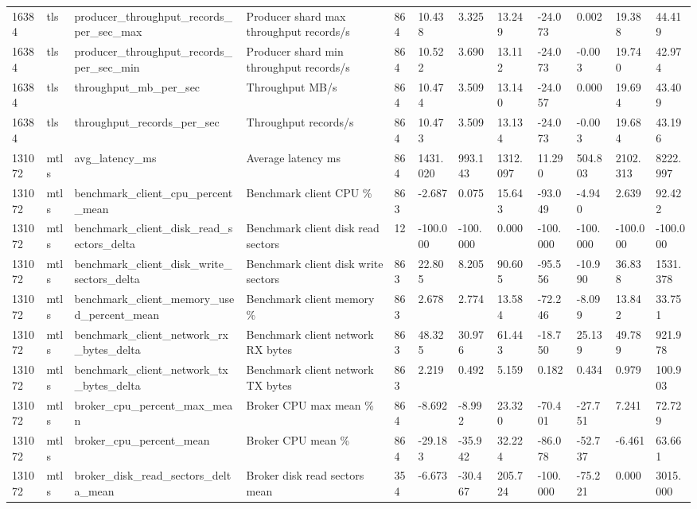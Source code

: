 \begin{longtable}{llllllllllll}
16384 & tls & producer\_throughput\_records\_per\_sec\_max & Producer shard max throughput records/s & 864 & 10.438 & 3.325 & 13.249 & -24.073 & 0.002 & 19.388 & 44.419 \\
16384 & tls & producer\_throughput\_records\_per\_sec\_min & Producer shard min throughput records/s & 864 & 10.522 & 3.690 & 13.112 & -24.073 & -0.003 & 19.740 & 42.974 \\
16384 & tls & throughput\_mb\_per\_sec & Throughput MB/s & 864 & 10.474 & 3.509 & 13.140 & -24.057 & 0.000 & 19.694 & 43.409 \\
16384 & tls & throughput\_records\_per\_sec & Throughput records/s & 864 & 10.473 & 3.509 & 13.134 & -24.073 & -0.003 & 19.684 & 43.196 \\
131072 & mtls & avg\_latency\_ms & Average latency ms & 864 & 1431.020 & 993.143 & 1312.097 & 11.290 & 504.803 & 2102.313 & 8222.997 \\
131072 & mtls & benchmark\_client\_cpu\_percent\_mean & Benchmark client CPU \% & 863 & -2.687 & 0.075 & 15.643 & -93.049 & -4.940 & 2.639 & 92.422 \\
131072 & mtls & benchmark\_client\_disk\_read\_sectors\_delta & Benchmark client disk read sectors & 12 & -100.000 & -100.000 & 0.000 & -100.000 & -100.000 & -100.000 & -100.000 \\
131072 & mtls & benchmark\_client\_disk\_write\_sectors\_delta & Benchmark client disk write sectors & 863 & 22.805 & 8.205 & 90.605 & -95.556 & -10.990 & 36.838 & 1531.378 \\
131072 & mtls & benchmark\_client\_memory\_used\_percent\_mean & Benchmark client memory \% & 863 & 2.678 & 2.774 & 13.584 & -72.246 & -8.099 & 13.842 & 33.751 \\
131072 & mtls & benchmark\_client\_network\_rx\_bytes\_delta & Benchmark client network RX bytes & 863 & 48.325 & 30.976 & 61.443 & -18.750 & 25.139 & 49.789 & 921.978 \\
131072 & mtls & benchmark\_client\_network\_tx\_bytes\_delta & Benchmark client network TX bytes & 863 & 2.219 & 0.492 & 5.159 & 0.182 & 0.434 & 0.979 & 100.903 \\
131072 & mtls & broker\_cpu\_percent\_max\_mean & Broker CPU max mean \% & 864 & -8.692 & -8.992 & 23.320 & -70.401 & -27.751 & 7.241 & 72.729 \\
131072 & mtls & broker\_cpu\_percent\_mean & Broker CPU mean \% & 864 & -29.183 & -35.942 & 32.224 & -86.078 & -52.737 & -6.461 & 63.661 \\
131072 & mtls & broker\_disk\_read\_sectors\_delta\_mean & Broker disk read sectors mean & 354 & -6.673 & -30.467 & 205.724 & -100.000 & -75.221 & 0.000 & 3015.000 \\

\end{longtable}
